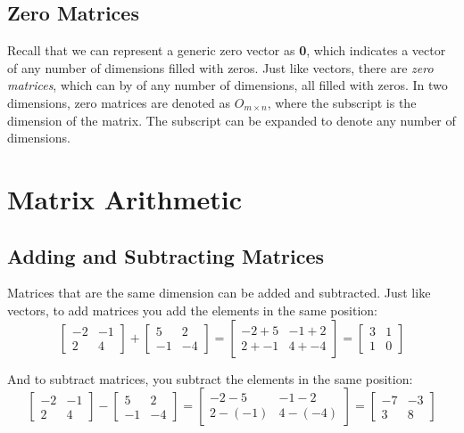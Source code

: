 \subsection{Zero Matrices}
Recall that we can represent a generic zero vector as \textbf{0}, which 
indicates a vector of any number of dimensions filled with zeros. Just like 
vectors, there are \textit{zero matrices}, which can by of 
any number of dimensions, all filled with zeros. In two dimensions, zero 
matrices are denoted as $\mathbf{\mathit{O}}_{m \times n}$, where the 
subscript is the dimension of the matrix. The subscript can be expanded to 
denote any number of dimensions. 

\section{Matrix Arithmetic}
\subsection{Adding and Subtracting Matrices}
Matrices that are the same dimension can be added and subtracted. Just like 
vectors, to add matrices you add the elements in the same position:
$$\begin{bmatrix}
-2 & -1\\
2 & 4
\end{bmatrix}
+ \begin{bmatrix}
5 & 2\\
-1 & -4
\end{bmatrix}
= \begin{bmatrix}
-2 + 5 & -1 + 2\\
2 + -1 & 4 + -4
\end{bmatrix} = 
\begin{bmatrix}
3 & 1\\
1 & 0
\end{bmatrix}$$

And to subtract matrices, you subtract the elements in the same position:
$$\begin{bmatrix}
-2 & -1\\
2 & 4
\end{bmatrix}
- \begin{bmatrix}
5 & 2\\
-1 & -4
\end{bmatrix}
= \begin{bmatrix}
-2 - 5 & -1 - 2\\
2 - (-1) & 4 - (-4)
\end{bmatrix} = 
\begin{bmatrix}
-7 & -3\\
3 & 8
\end{bmatrix}$$


